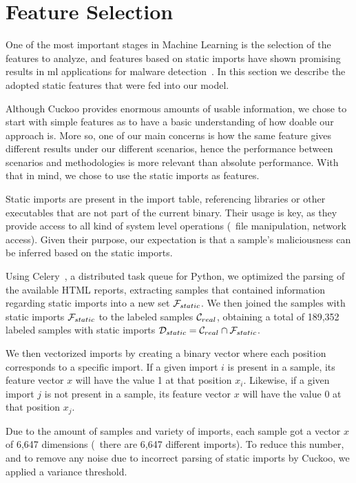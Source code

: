 \section{Feature Selection}
\label{section:feature_selection}

One of the most important stages in Machine Learning is the selection of the features to analyze, and features based on static imports have shown promising results in \gls{ml} applications for malware detection~\cite{miller:rev_int,schultz:data_mining}.
In this section we describe the adopted static features that were fed into our model.

Although Cuckoo provides enormous amounts of usable information, we chose to start with simple features as to have a basic understanding of how doable our approach is.
More so, one of our main concerns is how the same feature gives different results under our different scenarios, hence the performance between scenarios and methodologies is more relevant than absolute performance.
With that in mind, we chose to use the static imports as features.

Static imports are present in the import table, referencing libraries or other executables that are not part of the current binary.
Their usage is key, as they provide access to all kind of system level operations (\eg\ file manipulation, network access). Given their purpose, our expectation is that a sample's maliciousness can be inferred based on the static imports.

Using Celery~\cite{tool:celery}, a distributed task queue for Python, we optimized the parsing of the available HTML reports, extracting samples that contained information regarding static imports into a new set $\mathcal{F}_{static}$.
We then joined the samples with static imports $\mathcal{F}_{static}$ to the labeled samples $\mathcal{C}_{real}$, obtaining a total of 189,352 labeled samples with static imports $\mathcal{D}_{static} = \mathcal{C}_{real} \cap \mathcal{F}_{static}$.

We then vectorized imports by creating a binary vector where each position corresponds to a specific import.
If a given import $i$ is present in a sample, its feature vector $x$ will have the value 1 at that position $x_i$.
Likewise, if a given import $j$ is not present in a sample, its feature vector $x$ will have the value 0 at that position $x_j$.

Due to the amount of samples and variety of imports, each sample got a vector $x$ of 6,647 dimensions (\ie\ there are 6,647 different imports).
To reduce this number, and to remove any noise due to incorrect parsing of static imports by Cuckoo, we applied a variance threshold.

